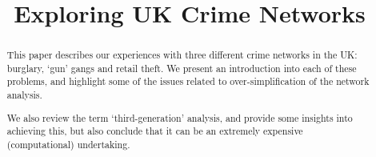 \documentclass[conference]{IEEEtran}
\theoremstyle{definition}
\begin{document}
%
\title{Exploring UK Crime Networks}

\author{
\and
{}
}





\maketitle


\begin{abstract}
This paper describes our experiences with three different crime
networks in the UK: burglary, `gun' gangs and retail theft. We present
an introduction into each of these problems, and highlight some of the
issues related to over-simplification of the network analysis.

We also review the term `third-generation' analysis, and provide some
insights into achieving this, but also conclude that it can be an
extremely expensive (computational) undertaking.
\end{abstract}

%
\IEEEpeerreviewmaketitle
\end{document}
